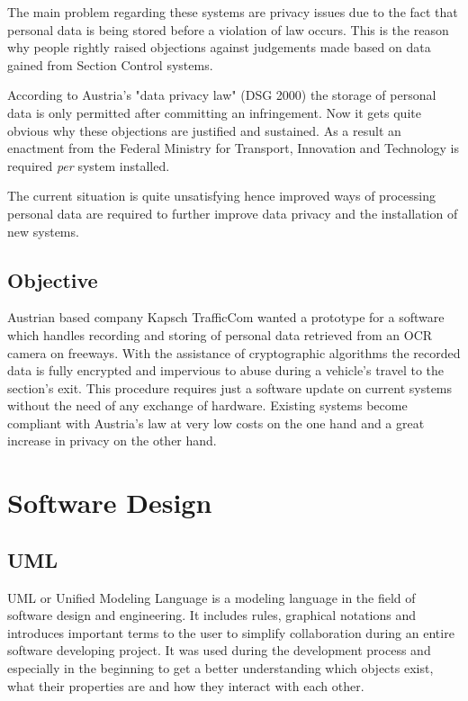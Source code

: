 \documentclass[oneside,bachelor,etd]{BYUPhys}
\begin{document}
The main problem regarding these systems are privacy issues due to the fact that personal data is being stored before a violation of law occurs. 
This is the reason why people rightly raised objections against judgements made based on data gained from Section Control systems. 
\par According to Austria's "data privacy law" (DSG 2000) the storage of personal data is only permitted after committing an infringement. 
Now it gets quite obvious why these objections are justified and sustained. As a result an enactment from 
the Federal Ministry for Transport, Innovation and Technology is required \textit{per} system installed.
\par The current situation is quite unsatisfying hence improved ways of processing personal data are required to further improve 
data privacy and the installation of new systems.


\section{Objective}
\label{sec:1objective}

Austrian based company Kapsch TrafficCom wanted a prototype for a software which handles recording and storing of personal data
retrieved from an OCR camera on freeways. With the assistance of cryptographic algorithms the recorded data is fully encrypted and impervious to abuse 
during a vehicle's travel to the section's exit. This procedure requires just a software update on current systems without 
the need of any exchange of hardware. Existing systems become compliant with Austria's law at very low costs on the one hand and 
a great increase in privacy on the other hand. 


\chapter{Software Design}
\section{UML}
\label{sec:2uml}

UML or Unified Modeling Language is a modeling language in the field of software design and engineering. 
It includes rules, graphical notations and introduces important terms to the user to simplify collaboration during
an entire software developing project. It was used during the development process and especially in the beginning
to get a better understanding which objects exist, what their properties are and how they interact with each other.
\end{document}
